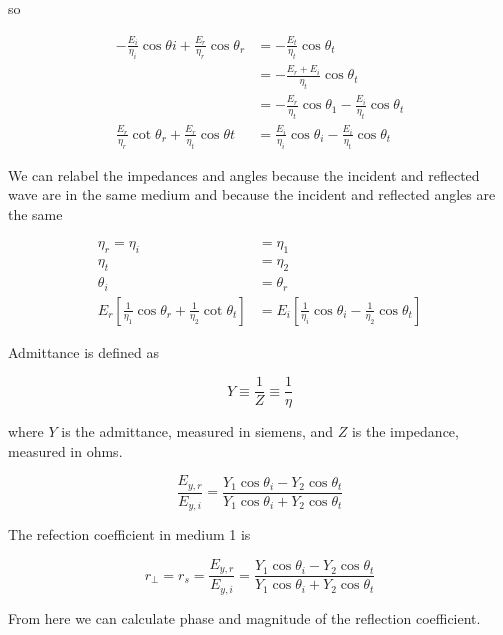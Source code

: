 \documentclass[main.tex]{subfiles}
\begin{document}
\begin{enumerate}
\begin{enumerate}
        so
        
        $$
        \begin{aligned}
        -\frac{E_i}{\eta_i} \cos \theta i+\frac{E_r}{\eta_r} \cos \theta_r &=-\frac{E_t}{\eta_t} \cos \theta_t \\
        &=-\frac{E_r+E_i}{\eta_t} \cos \theta_t \\
        &=-\frac{E_r}{\eta_t} \cos \theta_1-\frac{E_i}{\eta_t} \cos \theta_t \\
        \frac{E_r}{\eta_r} \cot \theta_r+\frac{E_r}{\eta_t} \cos \theta t &= \frac{E_i}{\eta_i} \cos \theta_i-\frac{E_i}{\eta_t} \cos \theta_t
        \end{aligned}
        $$
        
         We can relabel the impedances and angles because the incident and reflected wave are in the same medium and because the incident and reflected angles are the same
        
        $$
        \begin{aligned}
        \eta_r=\eta_i&=\eta_1\\
        \eta_t &= \eta_2 \\
        \theta_i &= \theta_r\\
        E_r\left[\frac{1}{\eta_1} \cos \theta_r+\frac{1}{\eta_2} \cot \theta_t\right] &= E_i\left[\frac{1}{\eta_i} \cos \theta_i - \frac{1}{\eta_2} \cos \theta_t\right]
       
        \end{aligned}
        $$

        Admittance is defined as
        
        $$
        Y \equiv \frac{1}{Z} \equiv \frac{1}{\eta}
        $$
        
        where $Y$ is the admittance, measured in siemens, and $Z$ is the impedance, measured in ohms.
    
        $$
        \frac{E_{y,r}}{E_{y,i}} = \frac{ Y_1 \cos \theta_i - Y_2 \cos \theta_t}{Y_1 \cos \theta_i + Y_2 \cos \theta_t}
        $$
        
        The refection coefficient in medium 1 is
        
        $$
        r_{\perp} = r_s = \frac{E_{y,r}}{E_{y,i}} =\frac{ Y_1 \cos \theta_i - Y_2 \cos \theta_t}{Y_1 \cos \theta_i + Y_2 \cos \theta_t}
        $$
        
        From here we can calculate phase and magnitude of the reflection coefficient.
    
    \end{enumerate}

\end{enumerate}
\end{document}
